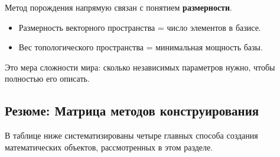 \documentclass[11pt, a4paper]{extarticle}
\begin{document}
\begin{remark}
Метод порождения напрямую связан с понятием \textbf{размерности}.
\begin{itemize}
    \item Размерность векторного пространства = число элементов в базисе.
    \item Вес топологического пространства = минимальная мощность базы.
\end{itemize}
Это мера сложности мира: сколько независимых параметров нужно, чтобы полностью его описать.
\end{remark}






\subsection*{Резюме: Матрица методов конструирования}

В таблице ниже систематизированы четыре главных способа создания математических объектов, рассмотренных в этом разделе.
\end{document}
